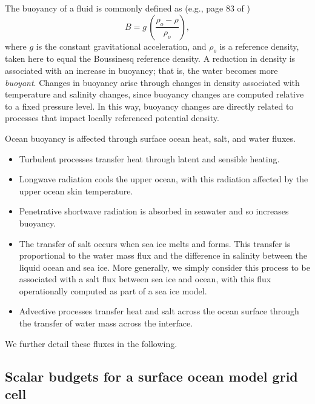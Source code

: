 The buoyancy of a fluid is commonly defined as (e.g., page 83 of
\cite{LargeKPP_lectures})
\begin{equation}
 B = g \, \left( \frac{ \rho_{o} - \rho}{\rho_{o}} \right), 
\label{eq:buoyancy-kpp}
\end{equation}
where $g$ is the constant gravitational acceleration, and $\rho_{o}$
is a reference density, taken here to equal the Boussinesq reference
density.  A reduction in density is associated with an increase in
buoyancy; that is, the water becomes more {\it buoyant}.  Changes in
buoyancy arise through changes in density associated with temperature
and salinity changes, since buoyancy changes are computed relative to
a fixed pressure level. In this way, buoyancy changes are directly
related to processes that impact locally referenced potential density.

Ocean buoyancy is affected through surface ocean heat, salt, and water
fluxes. 
\begin{itemize}

\item Turbulent processes transfer heat through latent and sensible
  heating.

\item Longwave radiation cools the upper ocean, with this radiation
  affected by the upper ocean skin temperature.  

\item Penetrative shortwave radiation is absorbed in seawater and so
  increases buoyancy.

\item The transfer of salt occurs when sea ice melts and forms.  This
  transfer is proportional to the water mass flux and the difference
  in salinity between the liquid ocean and sea ice.  More generally,
  we simply consider this process to be associated with a salt flux
  between sea ice and ocean, with this flux operationally computed as
  part of a sea ice model.

\item Advective processes transfer heat and salt across the ocean
  surface through the transfer of water mass across the interface.

\end{itemize}
  We further detail these fluxes in the following. 


\subsection{Scalar budgets for a surface ocean model grid cell}

